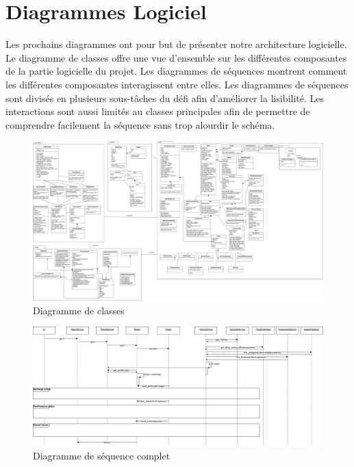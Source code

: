 \chapter{Diagrammes Logiciel}
Les prochains diagrammes ont pour but de présenter notre architecture logicielle.
Le diagramme de classes offre une vue d'ensemble sur les différentes composantes de la partie logicielle du projet. 
Les diagrammes de séquences montrent comment les différentes composantes interagissent entre elles.
Les diagrammes de séquences sont divisés en plusieurs sous-tâches du défi afin d'améliorer la lisibilité.
Les interactions sont aussi limités au classes principales afin de permettre de comprendre facilement la séquence sans trop alourdir le schéma.

\begin{landscape}
\begin{figure}
  \centering
  \includegraphics[scale=0.2, angle=0]{resources/diagrams/classDiagram.pdf}
  \caption{Diagramme de classes}
\end{figure}

\begin{figure}
  \centering
  \includegraphics[scale=0.45, angle=0]{resources/diagrams/sequenceDiagram.pdf}
  \caption{Diagramme de séquence complet}
\end{figure}


\end{landscape}
